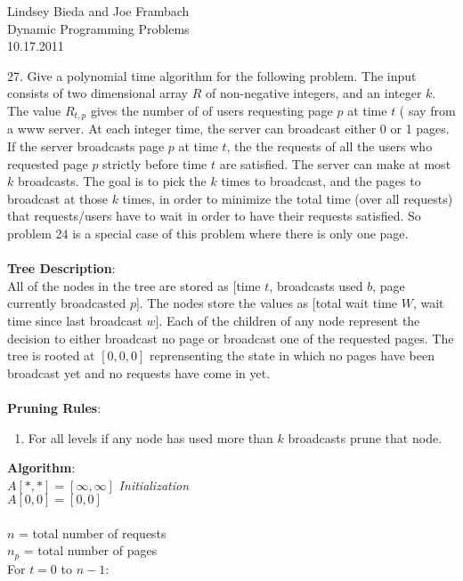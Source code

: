 \documentclass[10pt]{article}
\begin{document}
	\begin{flushright}
	Lindsey Bieda and Joe Frambach\\
	Dynamic Programming Problems\\
	10.17.2011
	\end{flushright}
		27.	Give a polynomial time algorithm for the following problem. The input consists of two dimensional
		array $R$ of non-negative integers, and an integer $k$. The value $R_{t,p}$ gives the number of of users
		requesting page $p$ at time $t$ ( say from a www server. At each integer time, the server can broadcast
		either 0 or 1 pages. If the server broadcasts page $p$ at time $t$, the the requests of all the users who
		requested page $p$ strictly before time $t$ are satisfied. The server can make at most $k$ broadcasts. The
		goal is to pick the $k$ times to broadcast, and the pages to broadcast at those $k$ times, in order to
		minimize the total time (over all requests) that requests/users have to wait in order to have their
		requests satisfied. So problem 24 is a special case of this problem where there is only one page.\\
		\\
		\textbf{Tree Description}:\\
		All of the nodes in the tree are stored as [time $t$, broadcasts used $b$, page currently broadcasted $p$]. 
		The nodes store the values as [total wait time $W$, wait time since last broadcast $w$]. Each of the children
		of any node represent the decision to either broadcast no page or broadcast one of the requested pages.
		The tree is rooted at $[0,0,0]$ reprensenting the state in which no pages have been broadcast yet and no
		requests have come in yet.\\
		\\
		\textbf{Pruning Rules}:\\
		\begin{enumerate}
			\item	For all levels if any node has used more than $k$ broadcasts prune that node. 
		\end{enumerate} 
		\textbf{Algorithm}:\\
		$A[*,*] = [\infty,\infty]$ \emph{Initialization}\\
		$A[0,0] = [0,0]$\\
		\\
		$n$ = total number of requests\\
		$n_p$ = total number of pages\\ 
		For $t = 0$ to $n-1$:\\
\end{document}

